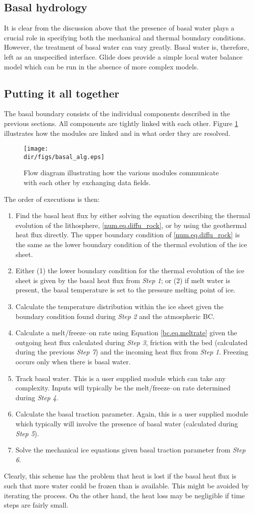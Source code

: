 

\subsection{Basal hydrology}
It is clear from the discussion above that the presence of basal water plays a crucial role in specifying both the mechanical and thermal boundary conditions. However, the treatment of basal water can vary greatly. Basal water is, therefore, left as an unspecified interface. Glide does provide a simple local water balance model which can be run in the absence of more complex models.

\subsection{Putting it all together}
The basal boundary consists of the individual components described in the previous sections. All components are tightly linked with each other. Figure \ref{num.fig.bc_flow} illustrates how the modules are linked and in what order they are resolved.
\begin{figure}[htbp]
  \centering
  \texttt{[image: \\dir/figs/basal\_alg.eps]}
  \caption{Flow diagram illustrating how the various modules communicate with each other by exchanging data fields.}
  \label{num.fig.bc_flow}
\end{figure}
The order of executions is then:
\begin{enumerate}
\item Find the basal heat flux by either solving the equation describing the thermal evolution of the lithosphere, \eqref{num.eq.diffu_rock}, or by using the geothermal heat flux directly. The upper boundary condition of \eqref{num.eq.diffu_rock} is the same as the lower boundary condition of the thermal evolution of the ice sheet.
\item Either (1) the lower boundary condition for the thermal evolution of the ice sheet is given by the basal heat flux from \emph{Step 1}; or (2) if melt water is present, the basal temperature is set to the pressure melting point of ice.
\item Calculate the temperature distribution within the ice sheet given the boundary condition found during \emph{Step 2} and the atmospheric BC.
\item Calculate a melt/freeze--on rate using Equation \eqref{bc.eq.meltrate} given the outgoing heat flux calculated during \emph{Step 3}, friction with the bed (calculated during the previous \emph{Step 7}) and the incoming heat flux from \emph{Step 1}. Freezing occurs only when there is basal water.
\item Track basal water. This is a user supplied module which can take any complexity. Inputs will typically be the melt/freeze--on rate determined during \emph{Step 4}.
\item Calculate the basal traction parameter. Again, this is a user supplied module which typically will involve the presence of basal water (calculated during \emph{Step 5}).
\item Solve the mechanical ice equations given basal traction parameter from \emph{Step 6}.
\end{enumerate}
Clearly, this scheme has the problem that heat is lost if the basal heat flux is such that more water could be frozen than is available. This might be avoided by iterating the process. On the other hand, the heat loss may be negligible if time steps are fairly small.
